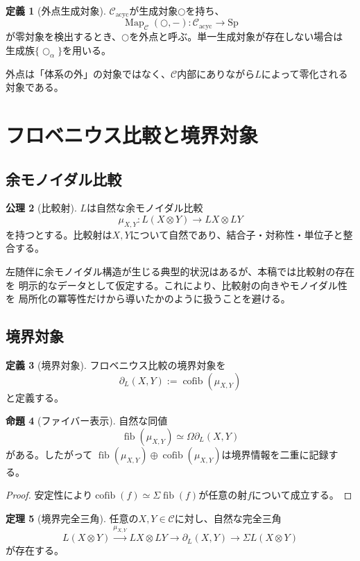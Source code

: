 \documentclass[11pt,a4paper]{ltjsarticle}
\theoremstyle{definition}
\newtheorem{definition}{定義}[section]
\newtheorem{axiom}[definition]{公理}
\newtheorem{theorem}[definition]{定理}
\newtheorem{proposition}[definition]{命題}
\theoremstyle{remark}
\newcommand{\C}{\mathcal{C}}
\newcommand{\Cacyc}{\mathcal{C}_{\mathrm{acyc}}}
\newcommand{\fib}{\operatorname{fib}}
\newcommand{\cofib}{\operatorname{cofib}}
\newcommand{\Map}{\operatorname{Map}}
\newcommand{\Boundary}{\partial_L}
\begin{document}
\begin{definition}[外点生成対象]
$\Cacyc$が生成対象$\bigcirc$を持ち、
\[
 \Map_{\C}(\bigcirc,-):\Cacyc\longrightarrow\mathrm{Sp}
\]
が零対象を検出するとき、$\bigcirc$を外点と呼ぶ。単一生成対象が存在しない場合は
生成族$\{\bigcirc_\alpha\}$を用いる。
\end{definition}

外点は「体系の外」の対象ではなく、$\C$内部にありながら$L$によって零化される対象である。

\section{フロベニウス比較と境界対象}

\subsection{余モノイダル比較}

\begin{axiom}[比較射]
$L$は自然な余モノイダル比較
\[
 \mu_{X,Y}:L(X\otimes Y)\longrightarrow LX\otimes LY
\]
を持つとする。比較射は$X,Y$について自然であり、結合子・対称性・単位子と整合する。
\end{axiom}

左随伴に余モノイダル構造が生じる典型的状況はあるが、本稿では比較射の存在を
明示的なデータとして仮定する。これにより、比較射の向きやモノイダル性を
局所化の冪等性だけから導いたかのように扱うことを避ける。

\subsection{境界対象}

\begin{definition}[境界対象]
フロベニウス比較の境界対象を
\[
 \Boundary(X,Y):=\cofib(\mu_{X,Y})
\]
と定義する。
\end{definition}

\begin{proposition}[ファイバー表示]
自然な同値
\[
 \fib(\mu_{X,Y})\simeq\Omega\Boundary(X,Y)
\]
がある。したがって
$\fib(\mu_{X,Y})\oplus\cofib(\mu_{X,Y})$は境界情報を二重に記録する。
\end{proposition}

\begin{proof}
安定性により$\cofib(f)\simeq\Sigma\fib(f)$が任意の射$f$について成立する。
\end{proof}

\begin{theorem}[境界完全三角]
任意の$X,Y\in\C$に対し、自然な完全三角
\begin{equation}
 L(X\otimes Y)\xrightarrow{\mu_{X,Y}}LX\otimes LY
 \longrightarrow\Boundary(X,Y)
 \longrightarrow\Sigma L(X\otimes Y)
 \label{eq:boundary-triangle}
\end{equation}
が存在する。
\end{theorem}
\end{document}
